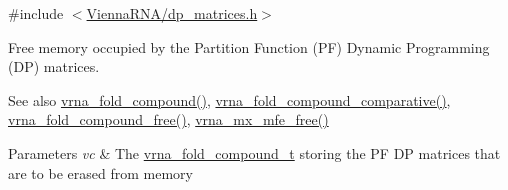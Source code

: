 {\ttfamily \#include $<$\hyperlink{dp__matrices_8h}{Vienna\+R\+N\+A/dp\+\_\+matrices.\+h}$>$}



Free memory occupied by the Partition Function (PF) Dynamic Programming (DP) matrices. 

\begin{DoxySeeAlso}{See also}
\hyperlink{group__fold__compound_ga6601d994ba32b11511b36f68b08403be}{vrna\+\_\+fold\+\_\+compound()}, \hyperlink{group__fold__compound_gad6bacc816af274922b13d947f708aa0c}{vrna\+\_\+fold\+\_\+compound\+\_\+comparative()}, \hyperlink{group__fold__compound_gadded6039d63f5d6509836e20321534ad}{vrna\+\_\+fold\+\_\+compound\+\_\+free()}, \hyperlink{group__dp__matrices_ga6a9422feb5dfe5c64050cebf447672d0}{vrna\+\_\+mx\+\_\+mfe\+\_\+free()}
\end{DoxySeeAlso}

\begin{DoxyParams}{Parameters}
{\em vc} & The \hyperlink{group__fold__compound_ga1b0cef17fd40466cef5968eaeeff6166}{vrna\+\_\+fold\+\_\+compound\+\_\+t} storing the PF DP matrices that are to be erased from memory \\
\hline
\end{DoxyParams}
